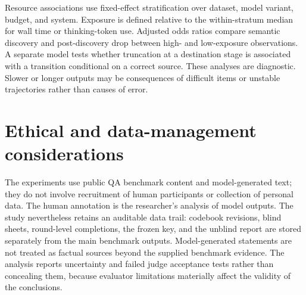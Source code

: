 Resource associations use fixed-effect stratification over dataset, model variant, budget, and system. Exposure is defined relative to the within-stratum median for wall time or thinking-token use. Adjusted odds ratios compare semantic discovery and post-discovery drop between high- and low-exposure observations. A separate model tests whether truncation at a destination stage is associated with a \ctow{} transition conditional on a correct source. These analyses are diagnostic. Slower or longer outputs may be consequences of difficult items or unstable trajectories rather than causes of error.

\section{Ethical and data-management considerations}

The experiments use public QA benchmark content and model-generated text; they do not involve recruitment of human participants or collection of personal data. The human annotation is the researcher's analysis of model outputs. The study nevertheless retains an auditable data trail: codebook revisions, blind sheets, round-level completions, the frozen key, and the unblind report are stored separately from the main benchmark outputs. Model-generated statements are not treated as factual sources beyond the supplied benchmark evidence. The analysis reports uncertainty and failed judge acceptance tests rather than concealing them, because evaluator limitations materially affect the validity of the conclusions.
